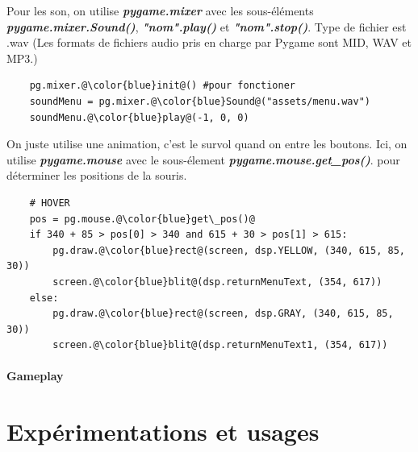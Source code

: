 \documentclass[a4paper]{report}
\begin{document}
Pour les son, on utilise \textbf{\textit{pygame.mixer}} avec les sous-éléments \textbf{\textit{pygame.mixer.Sound()}}, \textbf{\textit{"nom".play()}} et \textbf{\textit{"nom".stop()}}.
Type de fichier est .wav (Les formats de fichiers audio pris en charge par Pygame sont MID, WAV et MP3.)
\begin{lstlisting}
    pg.mixer.@\color{blue}init@() #pour fonctioner
    soundMenu = pg.mixer.@\color{blue}Sound@("assets/menu.wav")
    soundMenu.@\color{blue}play@(-1, 0, 0)
\end{lstlisting}

On juste utilise une animation, c'est le survol quand on entre les boutons.
Ici, on utilise \textbf{\textit{pygame.mouse}} avec le sous-élement \textbf{\textit{pygame.mouse.get\_pos()}}.
pour déterminer les positions de la souris.
\begin{lstlisting}
    # HOVER
    pos = pg.mouse.@\color{blue}get\_pos()@
    if 340 + 85 > pos[0] > 340 and 615 + 30 > pos[1] > 615:
        pg.draw.@\color{blue}rect@(screen, dsp.YELLOW, (340, 615, 85, 30))
        screen.@\color{blue}blit@(dsp.returnMenuText, (354, 617))
    else:
        pg.draw.@\color{blue}rect@(screen, dsp.GRAY, (340, 615, 85, 30))
        screen.@\color{blue}blit@(dsp.returnMenuText1, (354, 617))
\end{lstlisting}

\subsection{Gameplay}


\part{Expérimentations et usages}
\end{document}
